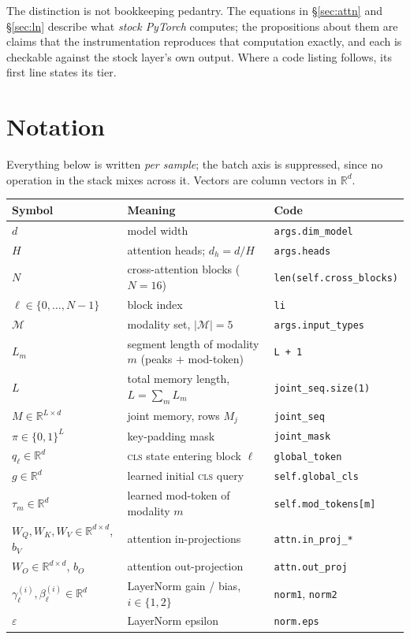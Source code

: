 \documentclass[11pt]{article}
\theoremstyle{plain}
\theoremstyle{remark}
\newcommand{\R}{\mathbb{R}}
\newcommand{\Mset}{\mathcal{M}}
\newcommand{\code}[1]{\texttt{\small #1}}
\begin{document}
\noindent
The distinction is not bookkeeping pedantry. The equations in
\S\ref{sec:attn} and \S\ref{sec:ln} describe what \emph{stock PyTorch} computes;
the propositions about them are claims that the instrumentation reproduces that
computation exactly, and each is checkable against the stock layer's own
output. Where a code listing follows, its first line states its tier.

\section{Notation}

Everything below is written \emph{per sample}; the batch axis is suppressed,
since no operation in the stack mixes across it. Vectors are column vectors in
$\R^d$.

\begin{center}
\footnotesize
\renewcommand{\arraystretch}{1.2}
\begin{tabular}{@{}l l l@{}}
\toprule
\textbf{Symbol} & \textbf{Meaning} & \textbf{Code} \\
\midrule
$d$ & model width & \code{args.dim\_model} \\
$H$ & attention heads; $d_h = d/H$ & \code{args.heads} \\
$N$ & cross-attention blocks ($N=16$) & \code{len(self.cross\_blocks)} \\
$\ell \in \{0,\dots,N-1\}$ & block index & \code{li} \\
$\Mset$ & modality set, $\lvert\Mset\rvert = 5$ & \code{args.input\_types} \\
$L_m$ & segment length of modality $m$ (peaks $+$ mod-token) & \code{L + 1} \\
$L$ & total memory length, $L = \sum\nolimits_m L_m$ & \code{joint\_seq.size(1)} \\
$M \in \R^{L\times d}$ & joint memory, rows $M_j$ & \code{joint\_seq} \\
$\pi \in \{0,1\}^L$ & key-padding mask & \code{joint\_mask} \\
$q_\ell \in \R^d$ & \textsc{cls} state entering block $\ell$ & \code{global\_token} \\
$g \in \R^d$ & learned initial \textsc{cls} query & \code{self.global\_cls} \\
$\tau_m \in \R^d$ & learned mod-token of modality $m$ & \code{self.mod\_tokens[m]} \\
$W_Q, W_K, W_V \in \R^{d\times d}$, $b_V$ & attention in-projections & \code{attn.in\_proj\_*} \\
$W_O \in \R^{d\times d}$, $b_O$ & attention out-projection & \code{attn.out\_proj} \\
$\gamma^{(i)}_\ell, \beta^{(i)}_\ell \in \R^d$ & LayerNorm gain / bias, $i\in\{1,2\}$ & \code{norm1}, \code{norm2} \\
$\varepsilon$ & LayerNorm epsilon & \code{norm.eps} \\
\bottomrule
\end{tabular}
\end{center}
\end{document}
